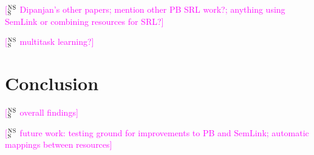 \documentclass[11pt,a4paper]{article}
\newcommand{\ensuretext}[1]{#1}
\newcommand{\nssmarker}{\ensuretext{\textcolor{magenta}{\ensuremath{^{\textsc{NS}}_{\textsc{S}}}}}}
\newcommand{\arkcomment}[3]{\ensuretext{\textcolor{#3}{[#1 #2]}}}
\newcommand{\nss}[1]{\arkcomment{\nssmarker}{#1}{magenta}}
\newcommand{\finalversion}[1]{}
\begin{document}
\nss{Dipanjan's other papers; mention other PB SRL work?; anything using SemLink or combining resources for SRL?}

\nss{multitask learning?}

\section{Conclusion}

\nss{overall findings}

\nss{future work: testing ground for improvements to PB and SemLink; automatic mappings between resources}

\finalversion{\section*{Acknowledgments}

FUNDING}

\smaller


\setlength{\bibsep}{1pt}
{\fontsize{10}{12.25}\selectfont
}
\end{document}
